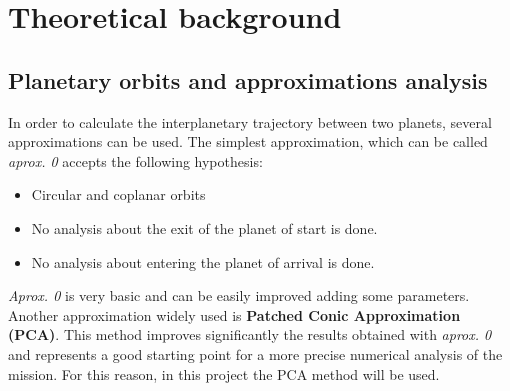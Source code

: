 \chapter{Theoretical background}



\section{Planetary orbits and approximations analysis}
In order to calculate the interplanetary trajectory between two planets, several approximations can be used. The simplest approximation, which can be called \textit{aprox. 0} accepts the following hypothesis: 
\begin{itemize}
\item Circular and coplanar orbits
\item No analysis about the exit of the planet of start is done.
\item No analysis about entering the planet of arrival is done. 
\end{itemize} 
\textit{Aprox. 0} is very basic and can be easily improved adding some parameters.\\
Another approximation widely used is \textbf{Patched Conic Approximation (PCA)}. This method improves significantly the results obtained with \textit{aprox. 0} and represents a good starting point for a more precise numerical analysis of the mission. For this reason, in this project the PCA method will be used. 
